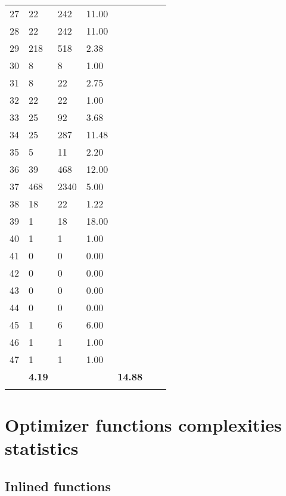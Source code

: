 \documentclass[12pt,a4paper]{report}
\begin{document}
{\begin{tabular}{ l l l l l l l }
27	& 22	& 242	& 11.00	& 	& 	&\\
28	& 22	& 242	& 11.00	& 	& 	&\\
29	& 218	& 518	& 2.38	& 	& 	&\\
30	& 8	& 8	& 1.00	& 	& 	&\\
31	& 8	& 22	& 2.75	& 	& 	&\\
32	& 22	& 22	& 1.00	& 	& 	&\\
33	& 25	& 92	& 3.68	& 	& 	&\\
34	& 25	& 287	& 11.48	& 	& 	&\\
35	& 5	& 11	& 2.20	& 	& 	&\\
36	& 39	& 468	& 12.00	& 	& 	&\\
37	& 468	& 2340	& 5.00	& 	& 	&\\
38	& 18	& 22	& 1.22	& 	& 	&\\
39	& 1	& 18	& 18.00	& 	& 	&\\
40	& 1	& 1	& 1.00	& 	& 	&\\
41	& 0	& 0	& 0.00	& 	& 	&\\
42	& 0	& 0	& 0.00	& 	& 	&\\
43	& 0	& 0	& 0.00	& 	& 	&\\
44	& 0	& 0	& 0.00	& 	& 	&\\
45	& 1	& 6	& 6.00	& 	& 	&\\
46	& 1	& 1	& 1.00	& 	& 	&\\
47	& 1	& 1	& 1.00	& 	& 	&\\
\hhline{-------}
\multicolumn{3}{l}{\textbf{Average}}  & \textbf{4.19}   &   &           & \textbf{14.88}\\
\hhline{-------}
\end{tabular}

} %

\newpage
\section*{Optimizer functions complexities statistics}

\subsection*{Inlined functions}

\vspace{0.5cm}
\end{document}
